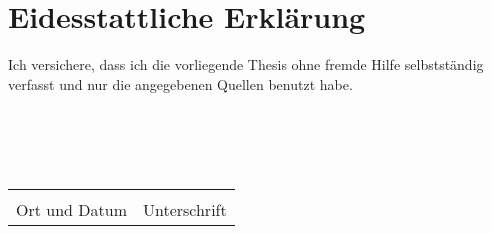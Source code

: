 \chapter*{Eidesstattliche Erklärung}

Ich versichere, dass ich die vorliegende Thesis ohne fremde Hilfe selbstständig verfasst und nur die angegebenen Quellen benutzt habe.\\
\\\\\\\\

\noindent\begin{tabular}{ll}
	\makebox[2.5in]{\hrulefill} & \makebox[2.5in]{\hrulefill}\\
	Ort und Datum & Unterschrift\\[8ex]%
\end{tabular}